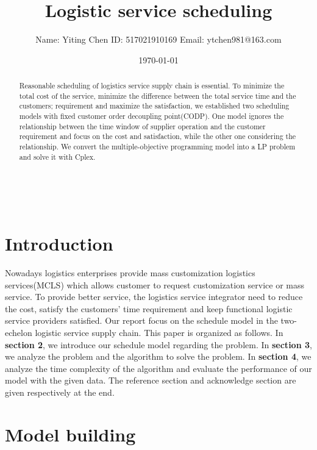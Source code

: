 \documentclass[12pt,a4paper]{article}
\title{Logistic service scheduling}
\author{Name: Yiting Chen  ID: 517021910169 Email: ytchen981@163.com 
 }
\date{\today}
\begin{document}
\maketitle
\begin{abstract}
Reasonable scheduling of logistics service supply chain is essential. To minimize the total cost of the service, minimize the difference between the total service time and the customers; requirement and maximize the satisfaction, we established two scheduling models with fixed customer order decoupling point(CODP). One model ignores the relationship between the time window of supplier operation and the customer requirement and focus on the cost and satisfaction, while the other one considering the relationship. We convert the multiple-objective programming model into a LP problem and solve it with Cplex.
\end{abstract}
\renewcommand{\contentsname}{catalog}
\tableofcontents
\newpage
\ \\
\section{Introduction}
Nowadays logistics enterprises provide mass customization logistics services(MCLS) which allows customer to  request customization service or mass service. To provide better service, the logistics service integrator need to reduce the cost, satisfy the customers' time requirement and keep functional logistic service providers satisfied. Our report focus on the schedule model in the two-echelon logistic service supply chain. This paper is organized as follows. In \textbf{section 2}, we introduce our schedule model regarding the problem. In \textbf{section 3}, we analyze the problem and the algorithm to solve the problem. In \textbf{section 4}, we analyze the time complexity of the algorithm and evaluate the performance of our model with the given data. The reference section and acknowledge section are given respectively at the end. 

\section{Model building}
\end{document}
